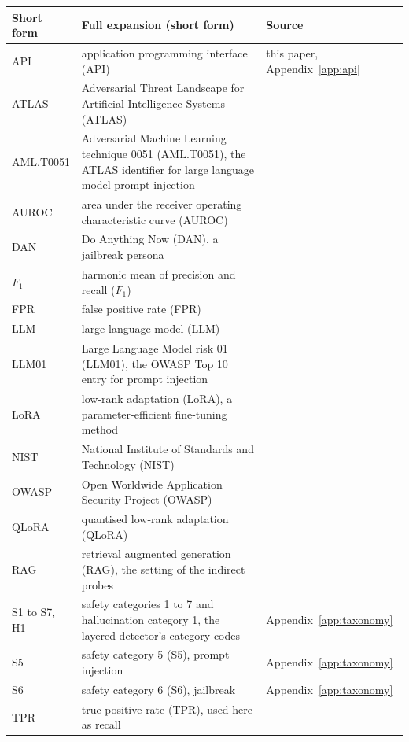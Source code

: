 \documentclass[conference]{IEEEtran}
\begin{document}
\begin{table}[t]
\centering
\footnotesize
\begin{tabular}{lp{6.4cm}l}
\toprule
Short form & Full expansion (short form) & Source \\
\midrule
API & application programming interface (API) & this paper, Appendix~\ref{app:api} \\
ATLAS & Adversarial Threat Landscape for Artificial-Intelligence Systems (ATLAS)
      & \cite{mitre_atlas} \\
AML.T0051 & Adversarial Machine Learning technique 0051 (AML.T0051), the ATLAS
      identifier for large language model prompt injection & \cite{mitre_atlas} \\
AUROC & area under the receiver operating characteristic curve (AUROC)
      & \cite{fawcett2006introduction, mann1947test} \\
DAN & Do Anything Now (DAN), a jailbreak persona & \cite{wei2023jailbroken} \\
$F_1$ & harmonic mean of precision and recall ($F_1$) & \cite{hastie2009elements} \\
FPR & false positive rate (FPR) & \cite{fawcett2006introduction} \\
LLM & large language model (LLM) & \cite{brown2020language} \\
LLM01 & Large Language Model risk 01 (LLM01), the OWASP Top 10 entry for prompt
      injection & \cite{owasp2025, owasp2026} \\
LoRA & low-rank adaptation (LoRA), a parameter-efficient fine-tuning method
      & \cite{hu2022lora} \\
NIST & National Institute of Standards and Technology (NIST)
      & \cite{nist_aiml_2025} \\
OWASP & Open Worldwide Application Security Project (OWASP)
      & \cite{owasp2025, owasp2026} \\
QLoRA & quantised low-rank adaptation (QLoRA) & \cite{dettmers2023qlora} \\
RAG & retrieval augmented generation (RAG), the setting of the indirect probes
      & \cite{greshake2023not} \\
S1 to S7, H1 & safety categories 1 to 7 and hallucination category 1, the
      layered detector's category codes & Appendix~\ref{app:taxonomy} \\
S5 & safety category 5 (S5), prompt injection & Appendix~\ref{app:taxonomy} \\
S6 & safety category 6 (S6), jailbreak & Appendix~\ref{app:taxonomy} \\
TPR & true positive rate (TPR), used here as recall
      & \cite{fawcett2006introduction} \\
\bottomrule
\end{tabular}
\end{table}
\end{document}
